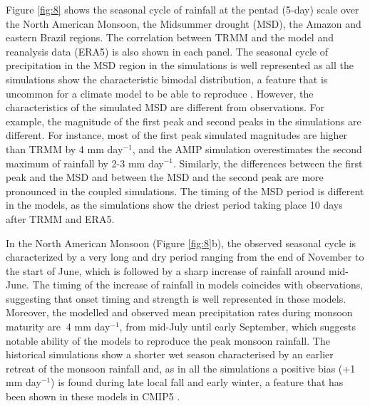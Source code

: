 Figure \ref{fig:8} shows the seasonal cycle of rainfall at the pentad (5-day) scale over the North American Monsoon, the  Midsummer drought (MSD), the Amazon and eastern Brazil regions. The correlation between TRMM and the model and reanalysis data (ERA5) is also shown in each panel. 
The seasonal cycle of precipitation in the MSD region in the simulations is well represented as all the simulations show the characteristic bimodal distribution, a feature that is uncommon for a climate model to be able to reproduce \citep{ryu2014}.
However, the characteristics of the simulated MSD are different from observations.
For example, the magnitude of the first peak and second peaks in the simulations are different. 
For instance, most of the first peak simulated magnitudes are higher than TRMM by 4 mm day$^{-1}$, and the AMIP simulation overestimates the second maximum of rainfall by 2-3 mm day$^{-1}$. Similarly, the differences between the first peak and the MSD and between the MSD and the second peak are more pronounced in the coupled simulations. The timing of the MSD period is different in the models, as the simulations show the driest period taking place 10 days after TRMM and ERA5. %
 
 

In the North American Monsoon (Figure \ref{fig:8}b), the observed seasonal cycle is characterized by a very long and dry period ranging from the end of November to the start of June, which is followed by a sharp increase of rainfall around mid-June. The timing of the increase of rainfall in models coincides with observations, suggesting that onset timing and strength is well represented in these models.
Moreover, the modelled and observed mean precipitation rates during monsoon maturity are $~$4 mm day$^{-1}$, from mid-July until early September, which suggests notable ability of the models to reproduce the peak monsoon rainfall.
   The historical simulations show a shorter wet season characterised by an earlier retreat of the monsoon rainfall and, as in all the simulations a positive bias (+1 mm day$^{-1}$) is found during late local fall and early winter, a feature that has been shown in these models in CMIP5 \citep{geil2013}. %


